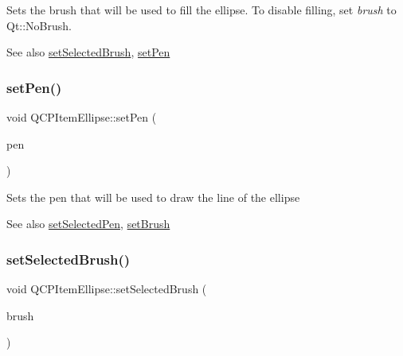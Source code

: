 Sets the brush that will be used to fill the ellipse. To disable filling, set {\itshape brush} to Qt\+::\+No\+Brush.

\begin{DoxySeeAlso}{See also}
\mbox{\hyperlink{class_q_c_p_item_ellipse_a9693501cfaa43a099655c75bed0dab3f}{set\+Selected\+Brush}}, \mbox{\hyperlink{class_q_c_p_item_ellipse_adb81a663ed2420fcfa011e49f678d1a6}{set\+Pen}} 
\end{DoxySeeAlso}
\mbox{\label{class_q_c_p_item_ellipse_adb81a663ed2420fcfa011e49f678d1a6}} 
\subsubsection{\texorpdfstring{set\+Pen()}{setPen()}}
{\footnotesize\ttfamily void Q\+C\+P\+Item\+Ellipse\+::set\+Pen (\begin{DoxyParamCaption}\item[{const Q\+Pen \&}]{pen }\end{DoxyParamCaption})}

Sets the pen that will be used to draw the line of the ellipse

\begin{DoxySeeAlso}{See also}
\mbox{\hyperlink{class_q_c_p_item_ellipse_a6c542fba1dc918041c583f58a50dde99}{set\+Selected\+Pen}}, \mbox{\hyperlink{class_q_c_p_item_ellipse_a49fc74e6965834e873d027d026def798}{set\+Brush}} 
\end{DoxySeeAlso}
\mbox{\label{class_q_c_p_item_ellipse_a9693501cfaa43a099655c75bed0dab3f}} 
\subsubsection{\texorpdfstring{set\+Selected\+Brush()}{setSelectedBrush()}}
{\footnotesize\ttfamily void Q\+C\+P\+Item\+Ellipse\+::set\+Selected\+Brush (\begin{DoxyParamCaption}\item[{const Q\+Brush \&}]{brush }\end{DoxyParamCaption})}

